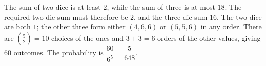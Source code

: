 The sum of two dice is at least $2$, while the sum of three is at most $18$. The required two-die sum must therefore be $2$, and the three-die sum $16$. The two dice are both $1$; the other three form either $(4,6,6)$ or $(5,5,6)$ in any order. There are $\binom52=10$ choices of the ones and $3+3=6$ orders of the other values, giving $60$ outcomes. The probability is $\dfrac{60}{6^5}=\boxed{\dfrac{5}{648}}$.
